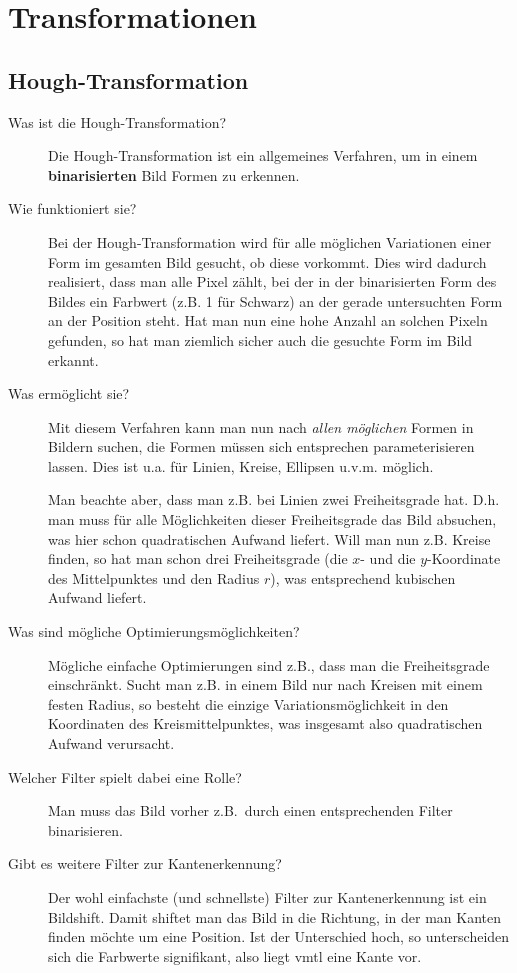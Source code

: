 \section{Transformationen}
\subsection{Hough-Transformation}
\begin{description}
	\item[Was ist die Hough-Transformation?]
      Die Hough-Transformation ist ein allgemeines Verfahren, um in einem \textbf{binarisierten} Bild Formen zu erkennen.
	\item[Wie funktioniert sie?]
      Bei der Hough-Transformation wird für alle möglichen Variationen einer Form im gesamten Bild
      gesucht, ob diese vorkommt. Dies wird dadurch realisiert, dass man alle Pixel zählt, 
      bei der in der binarisierten Form des Bildes ein Farbwert (z.B. 1 für Schwarz) an der gerade untersuchten
      Form an der Position steht. Hat man nun eine hohe Anzahl an solchen Pixeln
      gefunden, so hat man ziemlich sicher auch die gesuchte Form im Bild erkannt.
	\item[Was ermöglicht sie?]
      Mit diesem Verfahren kann man nun nach \emph{allen möglichen} Formen in Bildern suchen, die Formen müssen sich 
      entsprechen parameterisieren lassen. Dies ist u.a. für Linien, Kreise, Ellipsen u.v.m. möglich.

      Man beachte aber, dass man z.B. bei Linien zwei Freiheitsgrade hat. D.h. man muss für alle Möglichkeiten dieser
      Freiheitsgrade das Bild absuchen, was hier schon quadratischen Aufwand liefert. Will man nun z.B. Kreise finden,
      so hat man schon drei Freiheitsgrade (die $x$- und die $y$-Koordinate des Mittelpunktes und den Radius $r$), was
      entsprechend kubischen Aufwand liefert.
    \item[Was sind mögliche Optimierungsmöglichkeiten?]
      Mögliche einfache Optimierungen sind z.B., dass man die Freiheitsgrade einschränkt. Sucht man z.B. in einem Bild
      nur nach Kreisen mit einem festen Radius, so besteht die einzige Variationsmöglichkeit in den Koordinaten des
      Kreismittelpunktes, was insgesamt also quadratischen Aufwand verursacht.
	\item[Welcher Filter spielt dabei eine Rolle?]
  	Man muss das Bild vorher z.B.\ durch einen entsprechenden Filter binarisieren.
	\item[Gibt es weitere Filter zur Kantenerkennung?]
      Der wohl einfachste (und schnellste) Filter zur Kantenerkennung ist ein Bildshift. Damit shiftet man das Bild
      in die Richtung, in der man Kanten finden möchte um eine Position. Ist der Unterschied hoch, so unterscheiden
      sich die Farbwerte signifikant, also liegt vmtl eine Kante vor.\\


\end{description}

